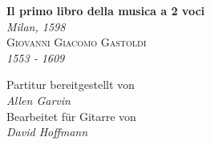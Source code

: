\documentclass[a4paper, 11pt]{article}
\begin{document}
\begin{titlepage}
	\centering
	{\LARGE\bfseries Il primo libro della musica a 2 voci}\\
	{\textit{Milan, 1598}}\\[\baselineskip]
	{\large\scshape Giovanni Giacomo Gastoldi}\\
	\textit{1553 - 1609}\par
	\vfill
{Partitur bereitgestellt von }\\
{\textit{Allen Garvin}}\\[\baselineskip]
{Bearbeitet für Gitarre von}\\
{\textit{David Hoffmann}}
\end{titlepage}
\end{document}
